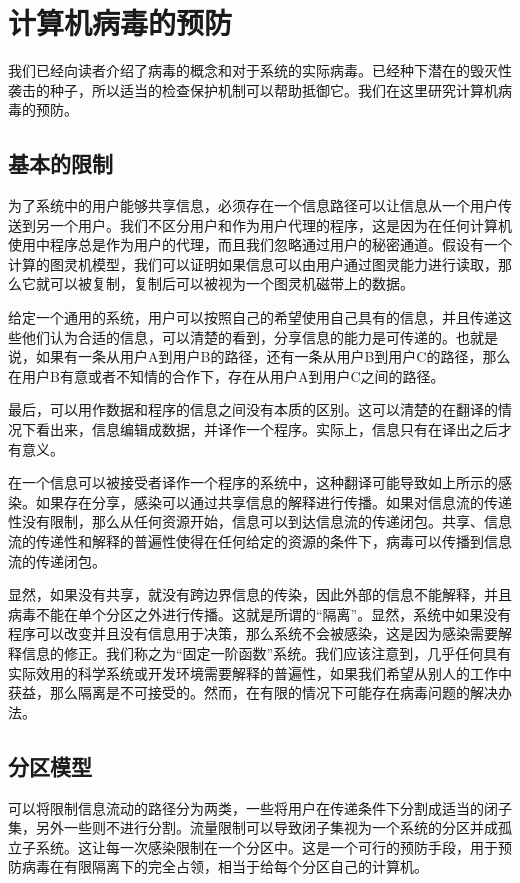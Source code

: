 \chapter{计算机病毒的预防}

我们已经向读者介绍了病毒的概念和对于系统的实际病毒。已经种下潜在的毁灭性袭击的种子，所以适当的检查保护机制可以帮助抵御它。我们在这里研究计算机病毒的预防。

\section{基本的限制}

为了系统中的用户能够共享信息，必须存在一个信息路径可以让信息从一个用户传送到另一个用户。我们不区分用户和作为用户代理的程序，这是因为在任何计算机使用中程序总是作为用户的代理，而且我们忽略通过用户的秘密通道。假设有一个计算的图灵机模型，我们可以证明如果信息可以由用户通过图灵能力进行读取，那么它就可以被复制，复制后可以被视为一个图灵机磁带上的数据。


给定一个通用的系统，用户可以按照自己的希望使用自己具有的信息，并且传递这些他们认为合适的信息，可以清楚的看到，分享信息的能力是可传递的。也就是说，如果有一条从用户A到用户B的路径，还有一条从用户B到用户C的路径，那么在用户B有意或者不知情的合作下，存在从用户A到用户C之间的路径。


最后，可以用作数据和程序的信息之间没有本质的区别。这可以清楚的在翻译的情况下看出来，信息编辑成数据，并译作一个程序。实际上，信息只有在译出之后才有意义。

在一个信息可以被接受者译作一个程序的系统中，这种翻译可能导致如上所示的感染。如果存在分享，感染可以通过共享信息的解释进行传播。如果对信息流的传递性没有限制，那么从任何资源开始，信息可以到达信息流的传递闭包。共享、信息流的传递性和解释的普遍性使得在任何给定的资源的条件下，病毒可以传播到信息流的传递闭包。


显然，如果没有共享，就没有跨边界信息的传染，因此外部的信息不能解释，并且病毒不能在单个分区之外进行传播。这就是所谓的“隔离”。显然，系统中如果没有程序可以改变并且没有信息用于决策，那么系统不会被感染，这是因为感染需要解释信息的修正。我们称之为“固定一阶函数”系统。我们应该注意到，几乎任何具有实际效用的科学系统或开发环境需要解释的普遍性，如果我们希望从别人的工作中获益，那么隔离是不可接受的。然而，在有限的情况下可能存在病毒问题的解决办法。


\section{分区模型}

可以将限制信息流动的路径分为两类，一些将用户在传递条件下分割成适当的闭子集，另外一些则不进行分割。流量限制可以导致闭子集视为一个系统的分区并成孤立子系统。这让每一次感染限制在一个分区中。这是一个可行的预防手段，用于预防病毒在有限隔离下的完全占领，相当于给每个分区自己的计算机。


